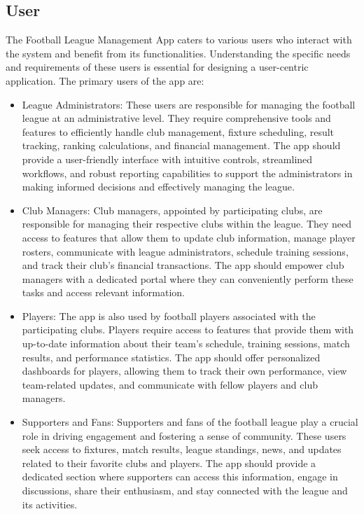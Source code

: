 \documentclass[12pt]{article}
\begin{document}
\subsection{ User }
The Football League Management App caters to various users who interact with the system and benefit from its functionalities. Understanding the specific needs and requirements of these users is essential for designing a user-centric application. The primary users of the app are:
\begin{itemize}
    \item League Administrators: These users are responsible for managing the football league at an administrative level. They require comprehensive tools and features to efficiently handle club management, fixture scheduling, result tracking, ranking calculations, and financial management. The app should provide a user-friendly interface with intuitive controls, streamlined workflows, and robust reporting capabilities to support the administrators in making informed decisions and effectively managing the league.

    \item Club Managers: Club managers, appointed by participating clubs, are responsible for managing their respective clubs within the league. They need access to features that allow them to update club information, manage player rosters, communicate with league administrators, schedule training sessions, and track their club's financial transactions. The app should empower club managers with a dedicated portal where they can conveniently perform these tasks and access relevant information.

    \item Players: The app is also used by football players associated with the participating clubs. Players require access to features that provide them with up-to-date information about their team's schedule, training sessions, match results, and performance statistics. The app should offer personalized dashboards for players, allowing them to track their own performance, view team-related updates, and communicate with fellow players and club managers.

    \item Supporters and Fans: Supporters and fans of the football league play a crucial role in driving engagement and fostering a sense of community. These users seek access to fixtures, match results, league standings, news, and updates related to their favorite clubs and players. The app should provide a dedicated section where supporters can access this information, engage in discussions, share their enthusiasm, and stay connected with the league and its activities.


\end{itemize}
\end{document}
